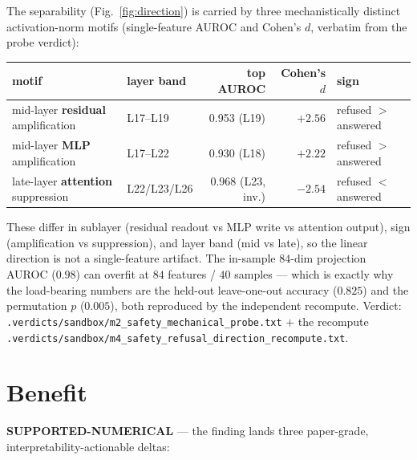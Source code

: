 \documentclass[11pt,a4paper]{article}
\begin{document}
\noindent The separability (Fig.~\ref{fig:direction}) is carried by three
mechanistically distinct activation-norm motifs (single-feature AUROC and
Cohen's \(d\), verbatim from the probe verdict):

\begin{center}
\begin{tabular}{llrrl}
\toprule
motif & layer band & top AUROC & Cohen's \(d\) & sign \\
\midrule
mid-layer \textbf{residual} amplification & L17--L19 & 0.953 (L19) & \(+2.56\) & refused \(>\) answered \\
mid-layer \textbf{MLP} amplification      & L17--L22 & 0.930 (L18) & \(+2.22\) & refused \(>\) answered \\
late-layer \textbf{attention} suppression & L22/L23/L26 & 0.968 (L23, inv.) & \(-2.54\) & refused \(<\) answered \\
\bottomrule
\end{tabular}
\end{center}

\noindent These differ in sublayer (residual readout vs MLP write vs attention
output), sign (amplification vs suppression), and layer band (mid vs late), so
the linear direction is not a single-feature artifact. The in-sample \(84\)-dim
projection AUROC (\(0.98\)) can overfit at \(84\) features / \(40\) samples ---
which is exactly why the load-bearing numbers are the held-out leave-one-out
accuracy (\(0.825\)) and the permutation \(p\) (\(0.005\)), both reproduced by
the independent recompute. Verdict:
\texttt{.verdicts/sandbox/m2\_safety\_mechanical\_probe.txt} \(+\) the recompute
\texttt{.verdicts/sandbox/m4\_safety\_refusal\_direction\_recompute.txt}.

\section{Benefit}
\label{sec:benefit}
\textcolor{green!50!black}{\textbf{SUPPORTED-NUMERICAL}} --- the finding lands
three paper-grade, interpretability-actionable deltas:
\end{document}
